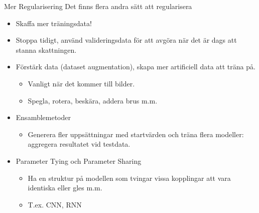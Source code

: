 \documentclass[10pt,english]{beamer}
\begin{document}
\begin{frame}{Mer Regularisering}
    Det finns flera andra sätt att regularisera
    \begin{itemize}
        \item Skaffa mer träningsdata!
        \item Stoppa tidigt, använd valideringsdata för att avgöra när det är dags att stanna skattningen.
        \item Förstärk data (dataset augmentation), skapa mer artificiell data att träna på.
        \begin{itemize}
            \item Vanligt när det kommer till bilder.
            \item Spegla, rotera, beskära, addera brus m.m.
        \end{itemize}
        \item Ensamblemetoder
        \begin{itemize}
            \item Generera fler uppsättningar med startvärden och träna flera modeller: aggregera resultatet vid testdata.
        \end{itemize}
        \item Parameter Tying och Parameter Sharing
        \begin{itemize}
            \item Ha en struktur på modellen som tvingar vissa kopplingar att vara identiska eller gles m.m.
            \item T.ex. CNN, RNN
        \end{itemize}
    \end{itemize}
\end{frame}
\end{document}
